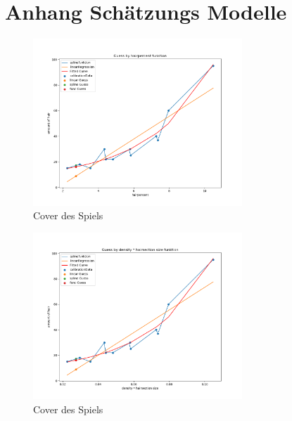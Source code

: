 \documentclass[german,a4paper,12pt,smallheadings,headsepline, titlepage, liststotoc, idextotoc,bibtoctoc,blibliography = totocnumbered]{scrartcl}
\begin{document}


\newpage
\appendix
\section{Anhang Schätzungs Modelle}
\begin{figure}
	\centering
	\includegraphics[width=0.7\textwidth]{fig64/g01_hairpercent.png}
	\caption[]{Cover des Spiels}
	\label{img:cover}
\end{figure}
\begin{figure}
	\centering
	\includegraphics[width=0.7\textwidth]{fig64/g02_densitynorm.png}
	\caption[]{Cover des Spiels}
	\label{img:cover}
\end{figure}
\end{document}
